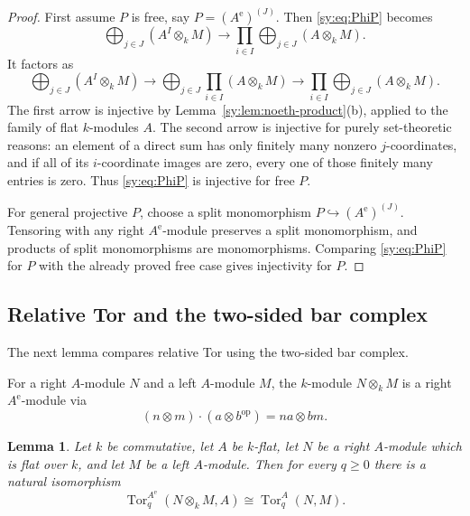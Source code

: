 \documentclass[11pt]{article}
\numberwithin{equation}{section}
\newtheorem{lemma}[theorem]{Lemma}
\theoremstyle{definition}
\theoremstyle{remark}
\newcommand{\Tor}{\operatorname{Tor}}
\begin{document}
\begin{proof}
First assume $P$ is free, say $P=(A^{\mathrm e})^{(J)}$.  Then
\eqref{sy:eq:PhiP} becomes
\[
\bigoplus_{j\in J}(A^I\otimes_kM)
\longrightarrow
\prod_{i\in I}\bigoplus_{j\in J}(A\otimes_kM).
\]
It factors as
\begin{equation}
\bigoplus_{j\in J}(A^I\otimes_kM)
\longrightarrow
\bigoplus_{j\in J}\prod_{i\in I}(A\otimes_kM)
\longrightarrow
\prod_{i\in I}\bigoplus_{j\in J}(A\otimes_kM).
\label{sy:eq:free-factorization}
\end{equation}
The first arrow is injective by Lemma~\ref{sy:lem:noeth-product}(b), applied
to the family of flat $k$-modules $A$.  The second arrow is injective for
purely set-theoretic reasons: an element of a direct sum has only finitely
many nonzero $j$-coordinates, and if all of its $i$-coordinate images are
zero, every one of those finitely many entries is zero.  Thus
\eqref{sy:eq:PhiP} is injective for free $P$.

For general projective $P$, choose a split monomorphism
$P\hookrightarrow (A^{\mathrm e})^{(J)}$.  Tensoring with any right
$A^{\mathrm e}$-module preserves a split monomorphism, and products of
split monomorphisms are monomorphisms.  Comparing \eqref{sy:eq:PhiP} for
$P$ with the already proved free case gives injectivity for $P$.
\end{proof}

\subsection{Relative Tor and the two-sided bar complex}

The next lemma compares relative Tor using the two-sided bar complex.

For a right $A$-module $N$ and a left $A$-module $M$, the $k$-module
$N\otimes_kM$ is a right $A^{\mathrm e}$-module via
\begin{equation}
(n\otimes m)\cdot(a\otimes b^{\mathrm{op}})=na\otimes bm.
\label{sy:eq:right-Ae-action}
\end{equation}

\begin{lemma}\label{sy:lem:relative-tor}
Let $k$ be commutative, let $A$ be $k$-flat, let $N$ be a right
$A$-module which is flat over $k$, and let $M$ be a left $A$-module.
Then for every $q\geq0$ there is a natural isomorphism
\begin{equation}
\Tor_q^{A^{\mathrm e}}(N\otimes_kM,A)
\cong
\Tor_q^A(N,M).
\label{sy:eq:relative-tor-iso}
\end{equation}
\end{lemma}
\end{document}
